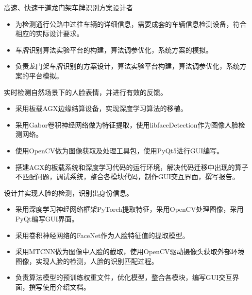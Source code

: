 \documentclass{resume}
\begin{document}
	高速、快速干道龙门架车牌识别方案设计者
	\begin{onehalfspacing}
		\begin{itemize}[parsep=0.5ex]
			\item 为检测通行公路中过往车辆的详细信息，需要成套的车辆信息检测设备，符合相应的实际设计要求。
			\item 车牌识别算法实验平台的构建，算法调参优化，系统方案的模拟。
			\item 负责龙门架车牌识别的方案设计，算法实验平台构建，算法调参优化，系统方案的平台模拟。
		\end{itemize}
	\end{onehalfspacing}
	
	实时检测自然场景下的人脸表情，并进行有效的反馈。
	\begin{onehalfspacing}
		\begin{itemize}[parsep=0.5ex]
			\item 采用板载AGX边缘结算设备，实现深度学习算法的移植。
			\item 采用Gabor卷积神经网络做为特征提取，使用libfaceDetection作为图像人脸检测网络。
			\item 使用OpenCV做为图像获取及处理工具包，使用PyQt5进行GUI编写。
			\item 搭建AGX的板载系统和深度学习代码的运行环境，解决代码迁移中出现的算子不匹配问题，调试系统，整合各模块代码，制作GUI交互界面，撰写报告。
		\end{itemize}
	\end{onehalfspacing}
	
	设计并实现人脸的检测，识别出身份信息。
	\begin{onehalfspacing}
		\begin{itemize}[parsep=0.5ex]
			\item 采用深度学习神经网络框架PyTorch提取特征，采用OpenCV处理图像，采用PyQt编写GUI界面。
			\item 采用卷积神经网络的FaceNet作为人脸特征值的提取模型。
			\item 采用MTCNN做为图像中人脸的截取，使用OpenCV驱动摄像头获取外部环境图像，实现人脸的检测，人脸的识别匹配过程。
			\item 负责算法模型的预训练权重文件，优化模型，整合各模块，编写GUI交互界面，撰写使用介绍文档。
		\end{itemize}
	\end{onehalfspacing}
	
\end{document}
